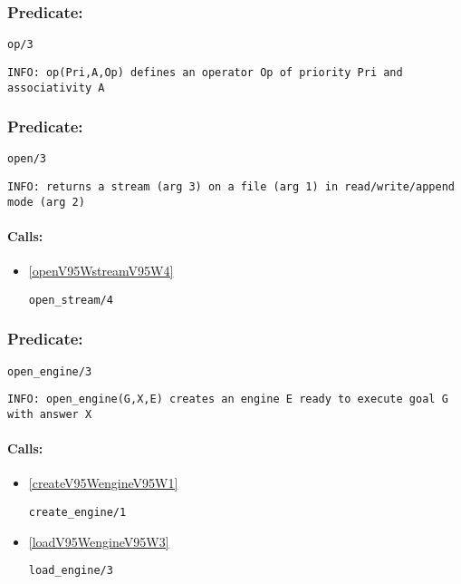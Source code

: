 \subsubsection{Predicate:} \label{opV95W3}

\begin{verbatim}
op/3
\end{verbatim}

{\small \begin{verbatim}
INFO: op(Pri,A,Op) defines an operator Op of priority Pri and associativity A

\end{verbatim}}

\subsubsection{Predicate:} \label{openV95W3}

\begin{verbatim}
open/3
\end{verbatim}

{\small \begin{verbatim}
INFO: returns a stream (arg 3) on a file (arg 1) in read/write/append mode (arg 2)

\end{verbatim}}
\paragraph{Calls:} 
\begin{itemize}
\item \ref{openV95WstreamV95W4} 
\begin{verbatim}
open_stream/4
\end{verbatim}

\end{itemize}

\subsubsection{Predicate:} \label{openV95WengineV95W3}

\begin{verbatim}
open_engine/3
\end{verbatim}

{\small \begin{verbatim}
INFO: open_engine(G,X,E) creates an engine E ready to execute goal G with answer X

\end{verbatim}}
\paragraph{Calls:} 
\begin{itemize}
\item \ref{createV95WengineV95W1} 
\begin{verbatim}
create_engine/1
\end{verbatim}

\item \ref{loadV95WengineV95W3} 
\begin{verbatim}
load_engine/3
\end{verbatim}

\end{itemize}
